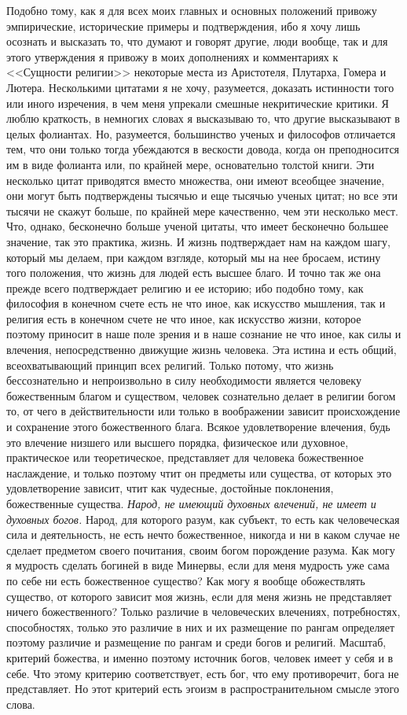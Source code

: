 \documentclass[12pt]{article}
\begin{document}
Подобно тому, как я для всех моих главных и основных положений привожу эмпирические, исторические примеры и подтверждения, ибо я хочу лишь осознать и высказать то, что думают и говорят другие, люди вообще, так и для этого утверждения я привожу в моих дополнениях и комментариях к <<Сущности религии>> некоторые места из Аристотеля, Плутарха, Гомера и Лютера. Несколькими цитатами я не хочу, разумеется, доказать истинности того или иного изречения, в чем меня упрекали смешные некритические критики. Я люблю краткость, в немногих словах я высказываю то, что другие высказывают в целых фолиантах. Но, разумеется, большинство ученых и философов отличается тем, что они только тогда убеждаются в вескости довода, когда он преподносится им в виде фолианта или, по крайней мере, основательно толстой книги. Эти несколько цитат приводятся вместо множества, они имеют всеобщее значение, они могут быть подтверждены тысячью и еще тысячью ученых цитат; но все эти тысячи не скажут больше, по крайней мере качественно, чем эти несколько мест. Что, однако, бесконечно больше ученой цитаты, что имеет бесконечно большее значение, так это практика, жизнь. И жизнь подтверждает нам на каждом шагу, который мы делаем, при каждом взгляде, который мы на нее бросаем, истину того положения, что жизнь для людей есть высшее благо. И точно так же она прежде всего подтверждает религию и ее историю; ибо подобно тому, как философия в конечном счете есть не что иное, как искусство мышления, так и религия есть в конечном счете не что иное, как искусство жизни, которое поэтому приносит в наше поле зрения и в наше сознание не что иное, как силы и влечения, непосредственно движущие жизнь человека. Эта истина и есть общий, всеохватывающий принцип всех религий. Только потому, что жизнь бессознательно и непроизвольно в силу необходимости является человеку божественным благом и существом, человек сознательно делает в религии богом то, от чего в действительности или только в воображении зависит происхождение и сохранение этого божественного блага. Всякое удовлетворение влечения, будь это влечение низшего или высшего порядка, физическое или духовное, практическое или теоретическое, представляет для человека божественное наслаждение, и только поэтому чтит он предметы или существа, от которых это удовлетворение зависит, чтит как чудесные, достойные поклонения, божественные существа. \emph{Народ, не имеющий духовных влечений, не имеет и духовных богов.} Народ, для которого разум, как субъект, то есть как человеческая сила и деятельность, не есть нечто божественное, никогда и ни в каком случае не сделает предметом своего почитания, своим богом порождение разума. Как могу я мудрость сделать богиней в виде Минервы, если для меня мудрость уже сама по себе ни есть божественное существо? Как могу я вообще обожествлять существо, от которого зависит моя жизнь, если для меня жизнь не представляет ничего божественного? Только различие в человеческих влечениях, потребностях, способностях, только это различие в них и их размещение по рангам определяет поэтому различие и размещение по рангам и среди богов и религий. Масштаб, критерий божества, и именно поэтому источник богов, человек имеет у себя и в себе. Что этому критерию соответствует, есть бог, что ему противоречит, бога не представляет. Но этот критерий есть эгоизм в распространительном смысле этого слова. 
\end{document}
